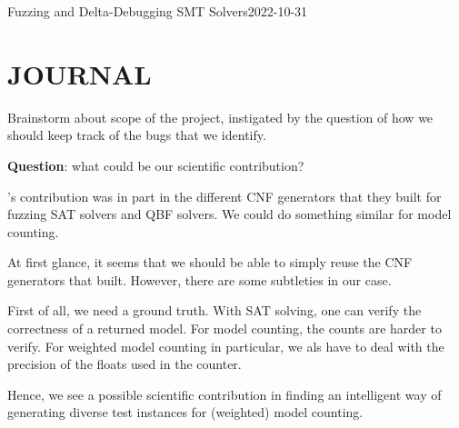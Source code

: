 \documentclass[a4paper]{tufte-handout}
\begin{document}
\begin{papersummary}{\citep{BB09}}{Fuzzing and Delta-Debugging SMT Solvers}{2022-10-31}
%		
%		
%		
		
	\end{papersummary}
	
	
	\section*{JOURNAL}
	
	
	
	Brainstorm about scope of the project, instigated by the question of how we should keep track of the bugs that we identify.
	
	{\bf Question}: what could be our scientific contribution?
	
	\citep{BLB10}'s contribution was in part in the different CNF generators that they built for fuzzing SAT solvers and QBF solvers.
	We could do something similar for model counting.
	
	At first glance, it seems that we should be able to simply reuse the CNF generators that \citep{BLB10} built.
	However, there are some subtleties in our case.
	
	First of all, we need a ground truth.
	With SAT solving, one can verify the correctness of a returned model.
	For model counting, the counts are harder to verify.
	For weighted model counting in particular, we als have to deal with the precision of the floats used in the counter.
	
	Hence, we see a possible scientific contribution in finding an intelligent way of generating diverse test instances for (weighted) model counting.
	
\end{document}
